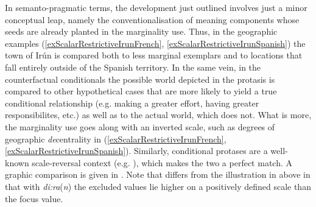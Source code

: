 In semanto-pragmatic terms, the development just outlined involves just a minor conceptual leap, namely the conventionalisation of meaning components whose seeds are already planted in the marginality use. Thus, in the geographic examples (\ref{exScalarRestrictiveIrunFrench}, \ref{exScalarRestrictiveIrunSpanish}) the town of Irún is compared both to less marginal exemplars and to locations that fall entirely outside of the Spanish territory. In the same vein, in the counterfactual conditionals the possible world depicted in the protasis is compared to other hypothetical cases that are more likely to yield a true conditional relationship (e.g. making a greater effort, having greater responsibilites, etc.) as well as to the actual world, which does not. What is more, the marginality use goes along with an inverted scale, such as degrees of geographic \textit{de}centrality in (\ref{exScalarRestrictiveIrunFrench}, \ref{exScalarRestrictiveIrunSpanish}). Similarly, conditional protases are a well-known scale-reversal context (e.g. \cite[33–37]{Haspelmath1997}), which makes the two a perfect match. A graphic comparison is given in . Note that  differs from the  illustration in  above in that with  \textit{di:ra}(\textit{n}) the excluded values lie higher on a positively defined scale than the focus value. 

